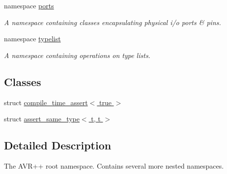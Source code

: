 \begin{DoxyCompactItemize}
\item 
namespace \hyperlink{namespaceavrpp_1_1ports}{ports}


\begin{DoxyCompactList}\small\item\em A namespace containing classes encapsulating physical i/o ports \& pins. \item\end{DoxyCompactList}

\item 
namespace \hyperlink{namespaceavrpp_1_1typelist}{typelist}


\begin{DoxyCompactList}\small\item\em A namespace containing operations on type lists. \item\end{DoxyCompactList}

\end{DoxyCompactItemize}
\subsection*{Classes}
\begin{DoxyCompactItemize}
\item 
struct \hyperlink{structavrpp_1_1compile__time__assert_3_01true_01_4}{compile\_\-time\_\-assert$<$ true $>$}
\item 
struct \hyperlink{structavrpp_1_1assert__same__type_3_01t_00_01t_01_4}{assert\_\-same\_\-type$<$ t, t $>$}
\end{DoxyCompactItemize}


\subsection{Detailed Description}
The AVR++ root namespace. Contains several more nested namespaces. 